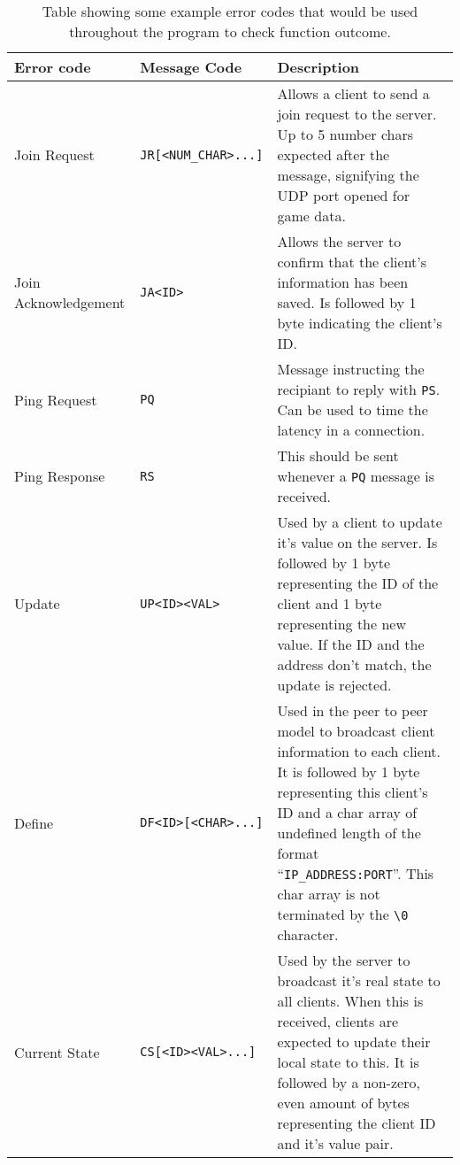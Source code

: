 \begin{table}[p]
  \centering
  \begin{tabular}{ l l p{}}
    \toprule
    Error code & Message Code & Description \\
    \midrule
    Join Request &
      \lstinline[]$JR[<NUM_CHAR>...]$ &
      Allows a client to send a join request to the server. Up to 5 number chars expected after the message, signifying the UDP port opened for game data. \\
    \addlinespace[10pt]
    Join Acknowledgement &
      \lstinline[]$JA<ID>$ &
      Allows the server to confirm that the client's information has been saved. Is followed by 1 byte indicating the client's ID. \\
    \addlinespace[10pt]
    Ping Request &
      \lstinline[]$PQ$ &
      Message instructing the recipiant to reply with \lstinline[]$PS$. Can be used to time the latency in a connection. \\
    \addlinespace[10pt]
    Ping Response &
      \lstinline[]$RS$ &
      This should be sent whenever a \lstinline[]$PQ$ message is received. \\
    \addlinespace[10pt]
    Update &
      \lstinline[]$UP<ID><VAL>$ &
      Used by a client to update it's value on the server. Is followed by 1 byte representing the ID of the client and 1 byte representing the new value. If the ID and the address don't match, the update is rejected. \\
    \addlinespace[10pt]
    Define &
      \lstinline[]$DF<ID>[<CHAR>...]$ &
      Used in the peer to peer model to broadcast client information to each client. It is followed by 1 byte representing this client's ID and a char array of undefined length of the format ``\lstinline[]$IP_ADDRESS:PORT$''. This char array is not terminated by the \lstinline[]$\0$ character. \\
    \addlinespace[10pt]
    Current State &
      \lstinline[]$CS[<ID><VAL>...]$ &
      Used by the server to broadcast it's real state to all clients. When this is received, clients are expected to update their local state to this. It is followed by a non-zero, even amount of bytes representing the client ID and it's value pair. \\

    \bottomrule
  \end{tabular}
  \caption{Table showing some example error codes that would be used throughout the program to check function outcome.}
  \label{table:message-codes}
\end{table}

